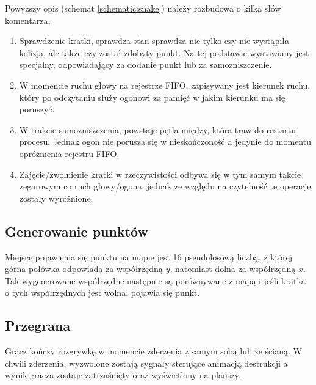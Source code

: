         Powyższy opis (schemat \ref*{schematic:snake}) należy rozbudowa o kilka słów komentarza,
        \begin{enumerate}
            \item Sprawdzenie kratki, sprawdza stan sprawdza nie tylko czy nie wystąpiła kolizja, ale także czy został zdobyty punkt. 
            Na tej podstawie wystawiany jest specjalny, odpowiadający za dodanie punkt lub za samozniszczenie.
            \item W momencie ruchu głowy na rejestrze FIFO, zapisywany jest kierunek ruchu, który po odczytaniu służy ogonowi za pamięć w jakim kierunku ma się poruszyć.
            \item W trakcie samozniszczenia, powstaje pętla między, która traw do restartu procesu. Jednak ogon nie porusza się w nieskończoność a jedynie do momentu opróżnienia rejestru FIFO.
            \item Zajęcie/zwolnienie kratki w rzeczywistości odbywa się w tym samym takcie zegarowym co ruch głowy/ogona, jednak ze względu na czytelność te operacje zostały wyróżnione.
        \end{enumerate}

        
    \subsection{Generowanie punktów}
        \tab Miejsce pojawienia się punktu na mapie jest 16 pseudolosową liczbą, z której górna połówka odpowiada za współrzędną $y$, natomiast dolna za współrzędną $x$.
        Tak wygenerowane współrzędne następnie są porównywane z mapą i jeśli kratka o tych współrzędnych jest wolna, pojawia się punkt.

    \subsection{Przegrana}
        \tab Gracz kończy rozgrywkę w momencie zderzenia z samym sobą lub ze ścianą.
        W chwili zderzenia, wyzwolone zostają sygnały sterujące animacją destrukcji
        a wynik gracza zostaje zatrzaśnięty oraz wyświetlony na planszy.


